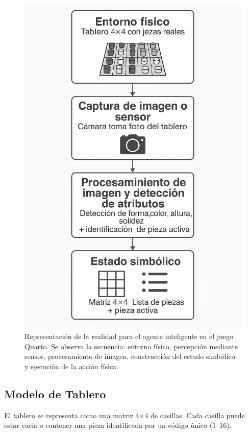 \documentclass[conference]{IEEEtran}
\begin{document}
\begin{figure}[h!]
	\centering
	\includegraphics[width=0.95\linewidth]{img/representacion-realidad.png}
	\caption{Representación de la realidad para el agente inteligente en el juego Quarto. Se observa la secuencia: entorno físico, percepción mediante sensor, procesamiento de imagen, construcción del estado simbólico y ejecución de la acción física.}
	\label{fig:representacion_realidad}
\end{figure}

\subsection{Modelo de Tablero}
El tablero se representa como una matriz 4×4 de casillas. Cada casilla puede estar vacía o contener una pieza identificada por un código único (1–16).
\end{document}
